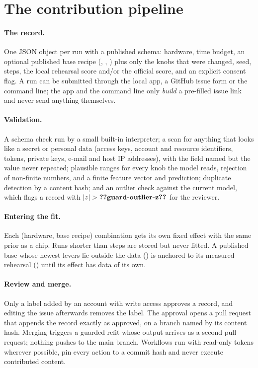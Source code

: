 \clearpage
\section{The contribution pipeline}
\label{app:contrib}

\paragraph{The record.} One JSON object per run with a published schema: hardware, time budget, an optional
published base recipe (, , ) plus only the knobs that were changed, seed, steps, the
local rehearsal score and/or the official score, and an explicit consent flag. A run can be submitted through the
local app, a GitHub issue form or the command line; the app and the command line only \emph{build} a pre-filled issue
link and never send anything themselves.

\paragraph{Validation.} A schema check run by a small built-in interpreter; a scan for anything that looks like a
secret or personal data (access keys, account and resource identifiers, tokens, private keys, e-mail and host IP
addresses), with the field named but the value never repeated; plausible ranges for every knob the model reads,
rejection of non-finite numbers, and a finite feature vector and prediction; duplicate detection by a content hash;
and an outlier check against the current model, which flags a record with $|z|>\val{guard-outlier-z}$ for the
reviewer.

\paragraph{Entering the fit.} Each (hardware, base recipe) combination gets its own fixed effect with the same prior
as a chip. Runs shorter than  steps are stored but never fitted. A published base whose newest
levers lie outside the data () is anchored to its measured rehearsal () until its effect
has data of its own.

\paragraph{Review and merge.} Only a label added by an account with write access approves a record, and editing the
issue afterwards removes the label. The approval opens a pull request that appends the record exactly as approved, on a
branch named by its content hash. Merging triggers a guarded refit whose output arrives as a second pull request;
nothing pushes to the main branch. Workflows run with read-only tokens wherever possible, pin every action to a commit
hash and never execute contributed content.


